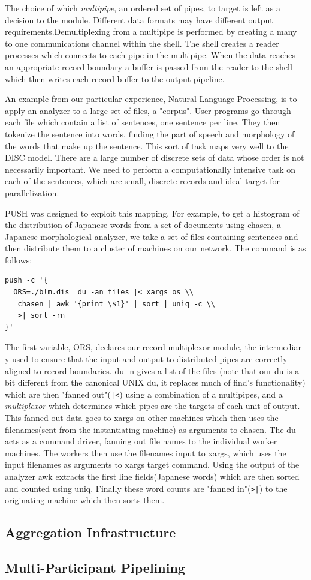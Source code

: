 The choice of which \emph{multipipe}, an ordered set of pipes, to target is
left as a decision to the module.
Different data formats may have different output requirements.Demultiplexing from a multipipe is performed by creating a many to one
communications channel within the shell. The shell creates a reader processes
which connects to each pipe in the multipipe. When the data reaches an
appropriate record boundary a buffer is passed from the reader to the shell
which then writes each record buffer to the output pipeline.

An example from our particular experience, Natural Language Processing, is
to apply an analyzer to a large set of files, a "corpus". User programs go
through each file which contain a list of sentences, one sentence per line.
They then tokenize the sentence into words, finding the part of speech and
morphology of the words that make up the sentence.
This sort of task maps very well to the DISC model. There are a large number of
discrete sets of data whose order is not necessarily important. We need to
perform a computationally intensive task on each of the sentences, which are
small, discrete records and ideal target for parallelization.

PUSH was designed to exploit this mapping. For example, to get a histogram of
the distribution of Japanese words from a set of documents using chasen,
a Japanese morphological analyzer, we take a set of files containing sentences
and then distribute them to a cluster of machines on our network. The command
is as follows:
\begin{verbatim}
push -c '{
  ORS=./blm.dis  du -an files |< xargs os \\
   chasen | awk '{print \$1}' | sort | uniq -c \\
   >| sort -rn
}'
\end{verbatim}

The first variable, ORS, declares our record multiplexor module, the intermediar
y
used to ensure that the input and output to distributed pipes are correctly
aligned to record boundaries. du -n gives a list of the files (note that our
du is a bit different from the canonical UNIX du, it replaces much of find's
functionality) which are then "fanned out"(\verb!|<!) using a combination
of a multipipes, and a \emph{multiplexor}
which determines which pipes are the targets of each unit of output.
This fanned out data goes to xargs on other machines which
then uses the filenames(sent from the instantiating machine) as arguments to
chasen. The du acts as a command driver, fanning out file names to the
individual worker machines. The workers then use the filenames input to
xargs, which uses the input filenames as arguments to xargs target command.
Using the output of the analyzer awk extracts the first line fields(Japanese
words) which are then sorted and counted using uniq.  Finally these word
counts are "fanned in"(\verb!>|!) to the originating machine which then
sorts them.


\subsection{Aggregation Infrastructure}

\subsection{Multi-Participant Pipelining}

